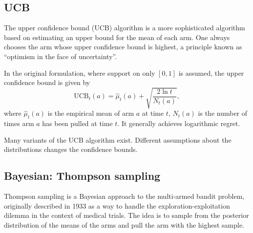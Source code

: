 \subsection{UCB}
The upper confidence bound (UCB) algorithm is a more sophisticated algorithm based on estimating an upper bound for the mean of each arm.
One always chooses the arm whose upper confidence bound is highest, a principle known as \enquote{optimism in the face of uncertainty}.

In the original formulation, where support on only $[0,1]$ is assumed, the upper confidence bound is given by
\begin{equation}
    \text{UCB}_t(a) = \hat{\mu}_t(a) + \sqrt{\frac{2\ln t}{N_t(a)}},
\end{equation}
where $\hat{\mu}_t(a)$ is the empirical mean of arm $a$ at time $t$, $N_t(a)$ is the number of times arm $a$ has been pulled at time $t$.
It generally achieves logarithmic regret.

Many variants of the UCB algorithm exist.
Different assumptions about the distributions changes the confidence bounds.

\subsection{Bayesian: Thompson sampling}
Thompson sampling is a Bayesian approach to the multi-armed bandit problem, originally described in 1933 as a way to handle the exploration-exploitation dilemma in the context of medical trials.
The idea is to sample from the posterior distribution of the means of the arms and pull the arm with the highest sample.